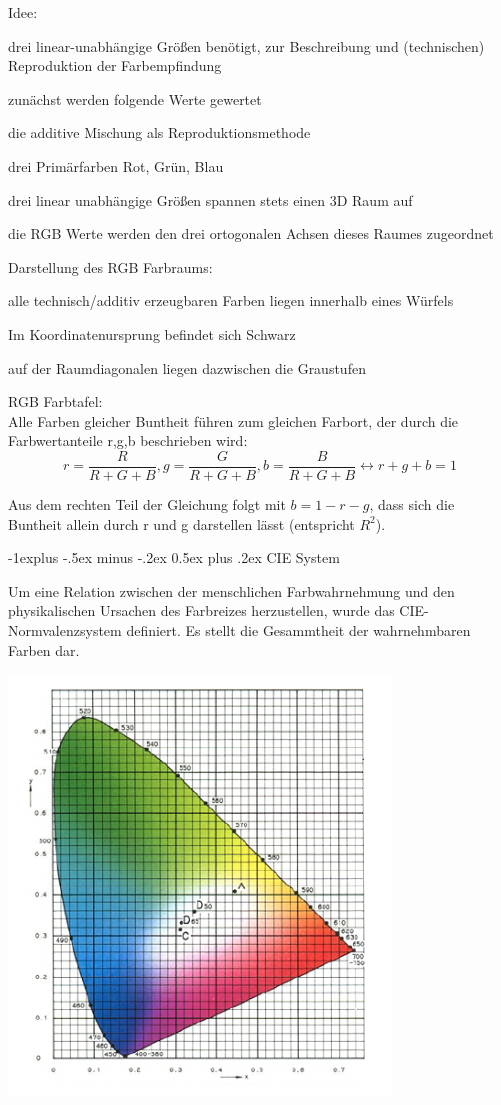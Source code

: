 \documentclass[landscape]{article}
\makeatletter
\renewcommand{\subsection}{\@startsection{subsection}{2}{0mm}%
                                {-1explus -.5ex minus -.2ex}%
                                {0.5ex plus .2ex}%
                                {\normalfont\normalsize\bfseries}}
\makeatother
\begin{document}
\begin{multicols}{3}
  Idee:
  \begin{itemize*}
    \item drei linear-unabhängige Größen benötigt, zur Beschreibung und (technischen) Reproduktion der Farbempfindung
    \item zunächst werden folgende Werte gewertet
    \begin{itemize*}
      \item die additive Mischung als Reproduktionsmethode
      \item drei Primärfarben Rot, Grün, Blau
      \item drei linear unabhängige Größen spannen stets einen 3D Raum auf
    \end{itemize*}
    \item die RGB Werte werden den drei ortogonalen Achsen dieses Raumes zugeordnet
  \end{itemize*}
  
  Darstellung des RGB Farbraums:
  \begin{itemize*}
    \item alle technisch/additiv erzeugbaren Farben liegen innerhalb eines Würfels
    \item Im Koordinatenursprung befindet sich Schwarz
    \item auf der Raumdiagonalen liegen dazwischen die Graustufen
  \end{itemize*}
  
  RGB Farbtafel:\\
  Alle Farben gleicher Buntheit führen zum gleichen Farbort, der durch die Farbwertanteile r,g,b beschrieben wird:
  $$r=\frac{R}{R+G+B}, g=\frac{G}{R+G+B}, b=\frac{B}{R+G+B} \leftrightarrow r+g+b=1$$
  
  Aus dem rechten Teil der Gleichung folgt mit $b=1-r-g$, dass sich die Buntheit allein durch r und g darstellen lässt (entspricht $R^2$).  
  
  \subsection{CIE System}
  \begin{minipage}[b]{0.25\textwidth}
    Um eine Relation zwischen der menschlichen Farbwahrnehmung und den physikalischen Ursachen des Farbreizes herzustellen, wurde das CIE-Normvalenzsystem definiert. Es stellt die Gesammtheit der wahrnehmbaren Farben dar.
  \end{minipage}
  \includegraphics[width=0.15\linewidth]{Assets/Computergrafik_CIE}
  

\end{multicols}
\end{document}
